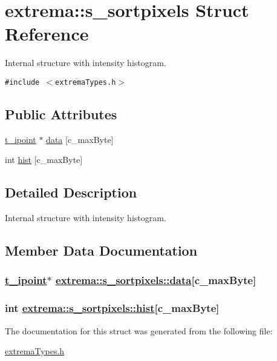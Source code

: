 \hypertarget{structextrema_1_1s__sortpixels}{
\section{extrema::s\_\-sortpixels Struct Reference}
\label{structextrema_1_1s__sortpixels}
}
Internal structure with intensity histogram.  


{\tt \#include $<$extrema\-Types.h$>$}

\subsection*{Public Attributes}
\begin{CompactItemize}
\item 
\hyperlink{structextrema_1_1t__ipoint}{t\_\-ipoint} $\ast$ \hyperlink{structextrema_1_1s__sortpixels_7f71c9217f999f68e366aca5477d992a}{data} \mbox{[}c\_\-max\-Byte\mbox{]}
\item 
int \hyperlink{structextrema_1_1s__sortpixels_256ce6a1d42b2c1c9e8cdb0dee92384e}{hist} \mbox{[}c\_\-max\-Byte\mbox{]}
\end{CompactItemize}


\subsection{Detailed Description}
Internal structure with intensity histogram. 



\subsection{Member Data Documentation}
\hypertarget{structextrema_1_1s__sortpixels_7f71c9217f999f68e366aca5477d992a}{
\subsubsection[data]{\setlength{\rightskip}{0pt plus 5cm}\hyperlink{structextrema_1_1t__ipoint}{t\_\-ipoint}$\ast$ \hyperlink{structextrema_1_1s__sortpixels_7f71c9217f999f68e366aca5477d992a}{extrema::s\_\-sortpixels::data}\mbox{[}c\_\-max\-Byte\mbox{]}}}
\label{structextrema_1_1s__sortpixels_7f71c9217f999f68e366aca5477d992a}


\hypertarget{structextrema_1_1s__sortpixels_256ce6a1d42b2c1c9e8cdb0dee92384e}{
\subsubsection[hist]{\setlength{\rightskip}{0pt plus 5cm}int \hyperlink{structextrema_1_1s__sortpixels_256ce6a1d42b2c1c9e8cdb0dee92384e}{extrema::s\_\-sortpixels::hist}\mbox{[}c\_\-max\-Byte\mbox{]}}}
\label{structextrema_1_1s__sortpixels_256ce6a1d42b2c1c9e8cdb0dee92384e}




The documentation for this struct was generated from the following file:\begin{CompactItemize}
\item 
\hyperlink{extremaTypes_8h}{extrema\-Types.h}\end{CompactItemize}
